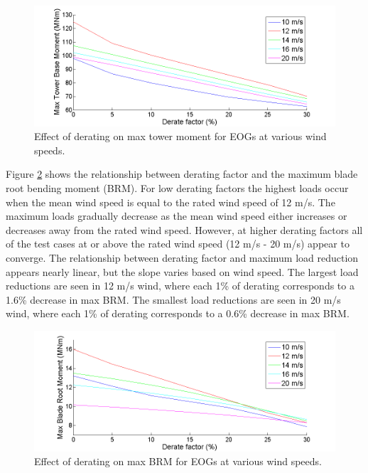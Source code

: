 \begin{figure}[htb]
	\centering
		\includegraphics[width = \linewidth]{Figures/ch4Figures/fig4-6.png}
		
	\caption{Effect of derating on max tower moment for EOGs at various wind speeds.}
	\label{fig4-6}
\end{figure}

Figure \ref{fig4-7} shows the relationship between derating factor and the maximum blade root bending moment (BRM). For low derating factors the highest loads occur when the mean wind speed is equal to the rated wind speed of 12 m/s. The maximum loads gradually decrease as the mean wind speed either increases or decreases away from the rated wind speed. However, at higher derating factors all of the test cases at or above the rated wind speed (12 m/s - 20 m/s) appear to converge. The relationship between derating factor and maximum load reduction appears nearly linear, but the slope varies based on wind speed. The largest load reductions are seen in 12 m/s wind, where each 1\% of derating corresponds to a 1.6\% decrease in max BRM. The smallest load reductions are seen in 20 m/s wind, where each 1\% of derating corresponds to a 0.6\% decrease in max BRM.

\begin{figure}[htb]
	\centering
		\includegraphics[width = \linewidth]{Figures/ch4Figures/fig4-7.png}
		
	\caption{Effect of derating on max BRM for EOGs at various wind speeds.}
	\label{fig4-7}
\end{figure}

